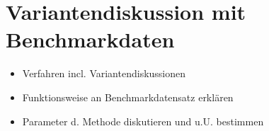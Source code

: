 \section{Variantendiskussion mit Benchmarkdaten}

\begin{itemize}
	\item Verfahren incl. Variantendiskussionen
	\item Funktionsweise an Benchmarkdatensatz erklären
	\item Parameter d. Methode diskutieren und u.U. bestimmen
\end{itemize}
